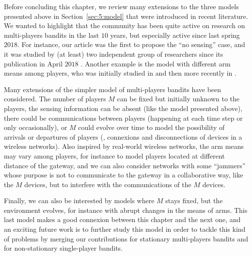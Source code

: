 Before concluding this chapter, we review many extensions to the three models presented above in Section~\ref{sec:5:model} that were introduced in recent literature.
%
We wanted to highlight that the community has been quite active on research on multi-players bandits in the last $10$ years, but especially active since last spring $2018$.
For instance, our article \cite{Besson2018ALT} was the first to propose the ``no sensing'' case, and it was studied by (at least) two independent group of researchers since its publication in April $2018$ \cite{BoursierPerchet18,LugosiMehrabian18}.
Another example is the model with different arm means among players, who was initially studied in \cite{Anandkumar10,Kalathil12} and then more recently in \cite{Bistritz18,KaufmannAbbas19}.
%

Many extensions of the simpler model of multi-players bandits have been considered.
The number of players $M$ can be fixed but initially unknown to the players, the sensing information can be absent (like the model \modeltrois{} presented above), there could be communications between players (happening at each time step or only occasionally), or $M$ could evolve over time to model the possibility of arrivals or departures of players (\ie, connexions and disconnections of devices in a wireless networks).
Also inspired by real-world wireless networks, the arm means may vary among players, for instance to model players located at different distance of the gateway, and we can also consider networks with some ``jammers'' whose purpose is not to communicate to the gateway in a collaborative way, like the $M$ devices, but to interfere with the communications of the $M$ devices.

Finally, we can also be interested by models where $M$ stays fixed, but the environment evolves, for instance with abrupt changes in the means of arms. This last model makes a good connexion between this chapter and the next one, and an exciting future work is to further study this model in order to tackle this kind of problems by merging our contributions for stationary multi-players bandits and for non-stationary single-player bandits.

